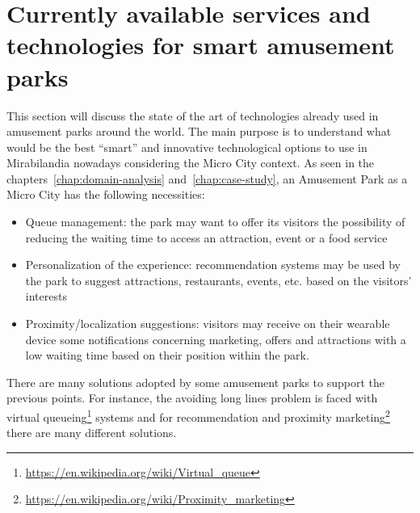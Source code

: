 

\section{Currently available services and technologies for smart amusement parks}\label{sec:state-of-the-art-analysis}
This section will discuss the state of the art of technologies already used in amusement parks around the world.
The main purpose is to understand what would be the best ``smart'' and innovative technological options to use in Mirabilandia nowadays considering the Micro City context.
As seen in the chapters~\ref{chap:domain-analysis} and~\ref{chap:case-study}, an Amusement Park as a Micro City has the following necessities:
\begin{itemize}
	\item Queue management: the park may want to offer its visitors the possibility of reducing the waiting time to access an attraction, event or a food service
	\item Personalization of the experience: recommendation systems may be used by the park to suggest attractions, restaurants, events, etc.
	      based on the visitors' interests
	\item Proximity/localization suggestions: visitors may receive on their wearable device some notifications concerning marketing, offers and attractions with a low waiting time based on their position within the park.
\end{itemize}

There are many solutions adopted by some amusement parks to support the previous points.
For instance, the avoiding long lines problem is faced with virtual queueing\footnote{\url{https://en.wikipedia.org/wiki/Virtual_queue}} systems
and for recommendation and proximity marketing\footnote{\url{https://en.wikipedia.org/wiki/Proximity_marketing}} there are many different solutions.

